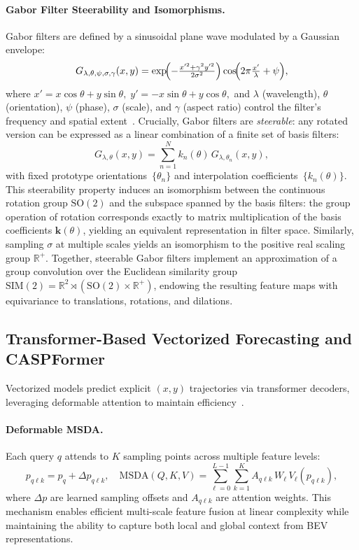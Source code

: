 \paragraph{Gabor Filter Steerability and Isomorphisms.}
Gabor filters are defined by a sinusoidal plane wave modulated by a Gaussian envelope:
\[
G_{\lambda,\theta,\psi,\sigma,\gamma}(x,y)
= \exp\!\Bigl(-\tfrac{x'^{2} + \gamma^{2}y'^{2}}{2\sigma^{2}}\Bigr)
  \cos\!\Bigl(2\pi \tfrac{x'}{\lambda} + \psi\Bigr),
\]
where
\(
x' = x\cos\theta + y\sin\theta,\;
y' = -x\sin\theta + y\cos\theta,
\)
and $\lambda$ (wavelength), $\theta$ (orientation), $\psi$ (phase), $\sigma$ (scale), and $\gamma$ (aspect ratio) control the filter's frequency and spatial extent~\cite{gabor}.
Crucially, Gabor filters are \emph{steerable}: any rotated version can be expressed as a linear combination of a finite set of basis filters:
\[
G_{\lambda,\theta}(x,y)
= \sum_{n=1}^N k_n(\theta)\,G_{\lambda,\theta_n}(x,y),
\]
with fixed prototype orientations~$\{\theta_n\}$ and interpolation coefficients~$\{k_n(\theta)\}$.
This steerability property induces an isomorphism between the continuous rotation group $\mathrm{SO}(2)$ and the subspace spanned by the basis filters: the group operation of rotation corresponds exactly to matrix multiplication of the basis coefficients $\mathbf{k}(\theta)$, yielding an equivalent representation in filter space.
Similarly, sampling $\sigma$ at multiple scales yields an isomorphism to the positive real scaling group $\mathbb{R}^+$.
Together, steerable Gabor filters implement an approximation of a group convolution over the Euclidean similarity group $\mathrm{SIM}(2)\!=\!\mathbb{R}^2\rtimes(\mathrm{SO}(2)\times\mathbb{R}^+)$, endowing the resulting feature maps with equivariance to translations, rotations, and dilations.

\subsection{Transformer-Based Vectorized Forecasting and CASPFormer}
Vectorized models predict explicit $(x,y)$ trajectories via transformer decoders, leveraging deformable attention to maintain efficiency~\cite{zhu2021deformabledetr,arXiv:2409.17790v1}.

\paragraph{Deformable MSDA.} Each query $q$ attends to $K$ sampling points across multiple feature levels:
\[
p_{q\ell k}=p_q + \Delta p_{q\ell k},\quad
\mathrm{MSDA}(Q,K,V)
= \sum_{\ell=0}^{L-1}\sum_{k=1}^K A_{q\ell k}\,W_\ell\,V_\ell(p_{q\ell k}),
\]
where $\Delta p$ are learned sampling offsets and $A_{q\ell k}$ are attention weights. This mechanism enables efficient multi-scale feature fusion at linear complexity while maintaining the ability to capture both local and global context from BEV representations.

